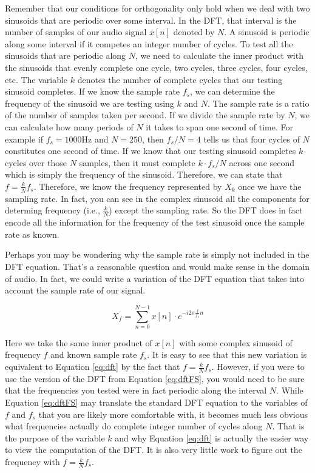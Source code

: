 Remember that our conditions for orthogonality only hold when we deal with two sinusoids that are periodic
 over some interval.
In the DFT, that interval is the number of samples of our audio signal $x[n]$ denoted by $N$. 
 A sinusoid is periodic along some interval if it competes an integer number
of cycles.  To test all the sinusoids that are periodic along $N$, we need to calculate the inner product with
the sinusoids that evenly complete one cycle, two cycles, three cycles, four cycles, etc.   The variable $k$ denotes
the number of complete cycles that our testing sinusoid completes.  If we know the sample rate $f_s$, we
can determine the frequency of the sinusoid we are testing using $k$ and $N$.  The sample rate is a ratio of
the number of samples taken per second.  If we divide the sample rate by $N$, we can calculate how many 
periods of $N$ it takes to span one second of time.  For example if $f_s = 1000$Hz and $N = 250$, then
$f_s/N = 4$ tells us that four cycles of $N$ constitutes one second of time.  If we know that our testing sinusoid
completes $k$ cycles over those $N$ samples, then it must complete $k \cdot f_s/N$ across one second which is
simply the frequency of the sinusoid.  Therefore, we can state that $f = \frac{k}{N}f_s$.  Therefore, we know the
frequency represented by $X_k$ once we have the sampling rate.  In fact, you can see in the complex sinusoid
all the components for determing frequency (i.e., $\frac{k}{N}$) except the sampling rate.  So the DFT does in
fact encode all the information for the frequency of the test sinusoid once the sample rate as known.  
	
	Perhaps
you may be wondering why the sample rate is simply not included in the DFT equation.  That's a reasonable 
question and would make sense in the domain of audio.  In fact, we could write a variation of the DFT equation
that takes into account the sample rate of our signal.

\begin{equation}
\label{eq:dftFS}
	X_f = \sum_{n = 0}^{N - 1}x[n] \cdot e^{-i2\pi \frac{f}{f_s}n}
\end{equation}

Here we take the same inner product of $x[n]$ with some complex sinusoid of frequency $f$ and known sample
rate $f_s$.  It is easy to see that this new variation is equivalent to Equation \ref{eq:dft} by the fact that 
$f = \frac{k}{N}f_s$.  However, if you were to use the version of the DFT from Equation \ref{eq:dftFS}, you
would need to be sure that the frequencies you tested were in fact periodic along the interval $N$.  While Equation
\ref{eq:dftFS} may translate the standard DFT equation to the variables of $f$ and $f_s$ that you are likely
more comfortable with, it becomes much less obvious what frequencies actually do complete integer number
of cycles along $N$.  That is the purpose of the variable $k$ and why Equation \ref{eq:dft} is actually the easier
way to view the computation of the DFT.  It is also very little work to figure out the frequency with 
$f = \frac{k}{N}f_s$.

